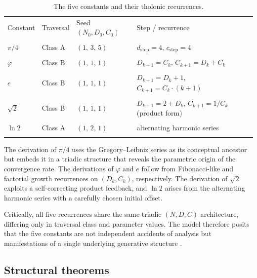 \documentclass[12pt]{article}
\begin{document}
{\renewcommand{\arraystretch}{1.4}
\begin{table}[ht]
\centering
\caption{The five constants and their tholonic recurrences.\label{tab:constants}}
\smallskip
\begin{tabular}{llll}
\toprule
Constant & Traversal & Seed $(N_0, D_0, C_0)$ & Step / recurrence \\\\
\midrule
$\pi/4$     & Class A & $(1,\,3,\,5)$ & $d_{\mathrm{step}}=4$, $c_{\mathrm{step}}=4$ \\\\
$\varphi$   & Class B & $(1,\,1,\,1)$ & $D_{k+1}=C_k$, $C_{k+1}=D_k+C_k$ \\\\
$e$         & Class B & $(1,\,1,\,1)$ & $D_{k+1}=D_k+1$, $C_{k+1}=C_k\cdot(k+1)$ \\\\
$\sqrt{2}$  & Class B & $(1,\,1,\,1)$ & $D_{k+1}=2+D_k$, $C_{k+1}=1/C_k$ (product form) \\\\
$\ln 2$     & Class A & $(1,\,2,\,1)$ & alternating harmonic series \\\\
\bottomrule
\end{tabular}
\end{table}}

The derivation of $\pi/4$ uses the Gregory--Leibniz series as its conceptual ancestor
but embeds it in a triadic structure that reveals the parametric origin of the
convergence rate.  The derivations of $\varphi$ and $e$ follow from Fibonacci-like and
factorial growth recurrences on $(D_k, C_k)$, respectively.  The derivation of
$\sqrt{2}$ exploits a self-correcting product feedback, and $\ln 2$ arises from the
alternating harmonic series with a carefully chosen initial offset.

Critically, all five recurrences share the same triadic $(N, D, C)$ architecture,
differing only in traversal class and parameter values.  The model therefore posits
that the five constants are not independent accidents of analysis but manifestations
of a single underlying generative structure \cite[Section~7]{Mil24}.

\subsection{Structural theorems}\label{sec:theorems}
\end{document}
